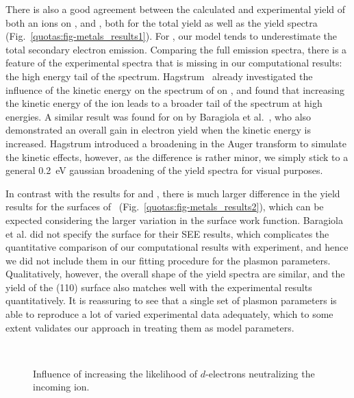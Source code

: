 \begin{refsection}
There is also a good agreement between the calculated and experimental yield of both  an  ions on ,  and , both for the total yield as well as the yield spectra (Fig.~\ref{quotas:fig-metals_results1}). For , our model tends to underestimate the total secondary electron emission. Comparing the full emission spectra, there is a feature of the experimental spectra that is missing in our computational results: the high energy tail of the spectrum. Hagstrum~\cite{Hagstrum1960} already investigated the influence of the kinetic energy on the spectrum of  on , and found that increasing the kinetic energy of the ion leads to a broader tail of the spectrum at high energies. A similar result was found for  on  by Baragiola et al.~\cite{Baragiola1996}, who also demonstrated an overall gain in electron yield when the kinetic energy is increased. Hagstrum introduced a broadening in the Auger transform to simulate the kinetic effects, however, as the difference is rather minor, we simply stick to a general 0.2~\si{\electronvolt} gaussian broadening of the yield spectra for visual purposes.

In contrast with the results for  and , there is much larger difference in the yield results for the surfaces of ~(Fig.~\ref{quotas:fig-metals_results2}), which can be expected considering the larger variation in the surface work function. Baragiola et al. did not specify the  surface for their SEE results, which complicates the quantitative comparison of our computational results with experiment, and hence we did not include them in our fitting procedure for the plasmon parameters. Qualitatively, however, the overall shape of the  yield spectra are similar, and the yield of the (110) surface also matches well with the experimental results quantitatively. It is reassuring to see that a single set of plasmon parameters is able to reproduce a lot of varied experimental data adequately, which to some extent validates our approach in treating them as model parameters. 

\begin{figure}[!h]
    \centering
    \begin{subfigure}[t]{0.49\textwidth}
        \centering
        
    \end{subfigure}%
    ~ 
    \begin{subfigure}[t]{0.49\textwidth}
        \centering
        
    \end{subfigure}
    \caption{\label{quotas:fig-d_influence} Influence of increasing the likelihood of $d$-electrons neutralizing the incoming ion.}
\end{figure}


\end{refsection}
